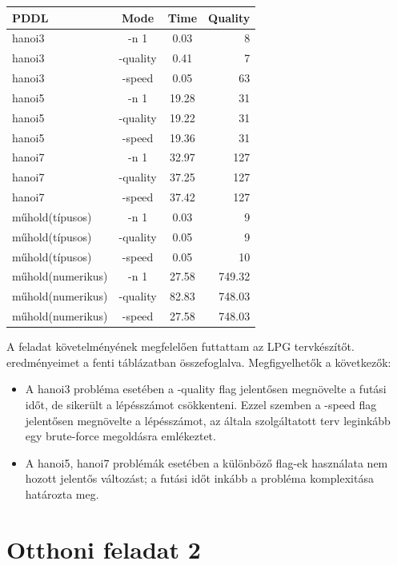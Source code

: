 \begin{center}
\begin{tabular}{ l | c | c | r }
	PDDL &  Mode &  Time & Quality \\ \hline
	hanoi3 &  -n 1 &  0.03 &  8 \\
	hanoi3 &   -quality &  0.41  &  7 \\
	hanoi3 &   -speed &  0.05 &  63 \\
	hanoi5 &  -n 1 & 19.28  & 31 \\
	hanoi5 &   -quality & 19.22  & 31 \\
	hanoi5 &   -speed &  19.36 &  31\\
	hanoi7 &  -n 1 & 32.97   & 127 \\
	hanoi7 &   -quality &  37.25 &  127\\
	hanoi7 &   -speed & 37.42  & 127 \\
	műhold(típusos) &  -n 1 & 0.03 & 9 \\
	műhold(típusos) & -quality & 0.05 & 9 \\
	műhold(típusos) & -speed & 0.05 & 10\\
	műhold(numerikus) &  -n 1 & 27.58 & 749.32 \\
	műhold(numerikus) & -quality & 82.83 & 748.03 \\
	műhold(numerikus) & -speed & 27.58 & 748.03\\
\end{tabular}
\end{center}

A feladat követelményének megfelelően futtattam az LPG tervkészítőt. eredményeimet a fenti táblázatban összefoglalva. Megfigyelhetők a következők:
\begin{itemize}
\item A hanoi3 probléma esetében a -quality flag jelentősen megnövelte a futási időt, de sikerült a lépésszámot csökkenteni. Ezzel szemben a -speed flag jelentősen megnövelte a lépésszámot, az általa szolgáltatott terv leginkább egy brute-force megoldásra emlékeztet.
\item  A hanoi5, hanoi7 problémák esetében a különböző flag-ek használata nem hozott jelentős változást; a futási időt inkább a probléma komplexitása határozta meg.
\end{itemize}

\section{Otthoni feladat 2}
